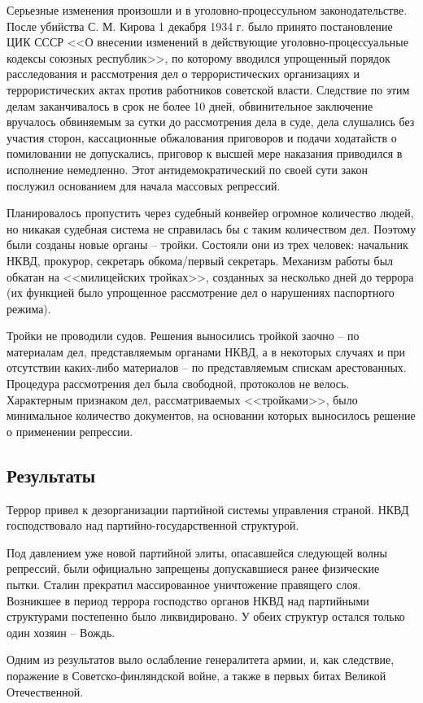 \documentclass[12pt]{article}
\begin{document}
  Серьезные изменения произошли и в уголовно-процессульном законодательстве.
  После убийства С. М. Кирова 1 декабря 1934 г. было принято постановление ЦИК СССР <<О внесении изменений в действующие уголовно-процессуальные кодексы союзных республик>>,
  по которому вводился упрощенный порядок расследования и рассмотрения дел о террористических организациях и террористических актах против работников советской власти.
  Следствие по этим делам заканчивалось в срок не более 10 дней, обвинительное заключение вручалось обвиняемым за сутки до рассмотрения дела в суде,
  дела слушались без участия сторон, кассационные обжалования приговоров и подачи ходатайств о помиловании не допускались,
  приговор к высшей мере наказания приводился в исполнение немедленно.
  Этот антидемократический по своей сути закон послужил основанием для начала массовых репрессий.

  Планировалось пропустить через судебный конвейер огромное количество людей, но никакая судебная система не справилась бы с таким количеством дел.
  Поэтому были созданы новые органы -- тройки.
  Состояли они из трех человек: начальник НКВД, прокурор, секретарь обкома/первый секретарь.
  Механизм работы был обкатан на <<милицейских тройках>>, созданных за несколько дней до террора (их функцией было упрощенное рассмотрение дел о нарушениях паспортного режима).

  Тройки не проводили судов.
  Решения выносились тройкой заочно -- по материалам дел, представляемым органами НКВД,
  а в некоторых случаях и при отсутствии каких-либо материалов -- по представляемым спискам арестованных.
  Процедура рассмотрения дел была свободной, протоколов не велось.
  Характерным признаком дел, рассматриваемых <<тройками>>, было минимальное количество документов,
  на основании которых выносилось решение о применении репрессии.


  \subsection{Результаты}
  Террор привел к дезорганизации партийной системы управления страной.
  НКВД господствовало над партийно-государственной структурой.

  Под давлением уже новой партийной элиты, опасавшейся следующей волны репрессий, были официально запрещены допускавшиеся ранее физические пытки.
  Сталин прекратил массированное уничтожение правящего слоя.
  Возникшее в период террора господство органов НКВД над партийными структурами постепенно было ликвидировано.
  У обеих структур остался только один хозяин -- Вождь.

  Одним из результатов выло ослабление генералитета армии, и, как следствие,
  поражение в Советско-финляндской войне, а также в первых битах Великой Отечественной.

\end{document}
